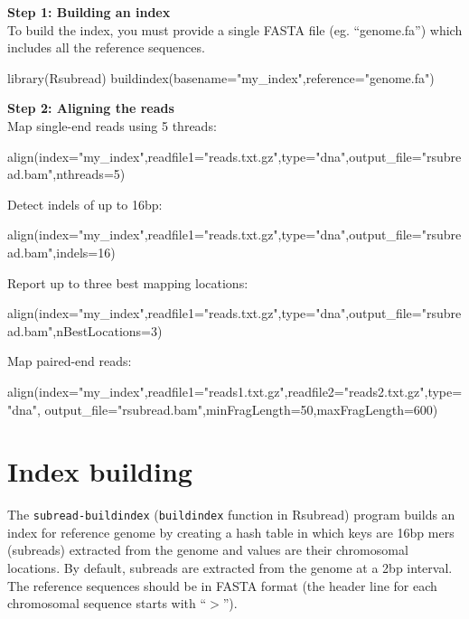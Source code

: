 \documentclass[12pt]{report}
\newcommand{\code}[1]{{\small\texttt{#1}}}
\newcommand{\Rsubread}{\textsf{Rsubread}}
\begin{document}
{\noindent\bf Step 1: Building an index}\\

\noindent To build the index, you must provide a single FASTA file (eg. ``genome.fa'') which includes all the reference sequences.

\begin{Rcode}
library(Rsubread)
buildindex(basename="my_index",reference="genome.fa")
\end{Rcode}

{\noindent\bf Step 2: Aligning the reads}\\

\noindent Map single-end reads using 5 threads:
\begin{Rcode}
align(index="my_index",readfile1="reads.txt.gz",type="dna",output_file="rsubread.bam",nthreads=5)
\end{Rcode}

\noindent Detect indels of up to 16bp:
\begin{Rcode}
align(index="my_index",readfile1="reads.txt.gz",type="dna",output_file="rsubread.bam",indels=16)
\end{Rcode}

\noindent Report up to three best mapping locations:
\begin{Rcode}
align(index="my_index",readfile1="reads.txt.gz",type="dna",output_file="rsubread.bam",nBestLocations=3)
\end{Rcode}

\noindent Map paired-end reads:
\begin{Rcode}
align(index="my_index",readfile1="reads1.txt.gz",readfile2="reads2.txt.gz",type="dna",
output_file="rsubread.bam",minFragLength=50,maxFragLength=600)
\end{Rcode}


\section{Index building}
\label{sec:index}

The \code{subread-buildindex} (\code{buildindex} function in \Rsubread) program builds an index for reference genome by creating a hash table in which keys are 16bp mers (subreads) extracted from the genome and values are their chromosomal locations.
By default, subreads are extracted from the genome at a 2bp interval.
The reference sequences should be in FASTA format (the header line for each chromosomal sequence starts with ``$>$'').\\
\end{document}
